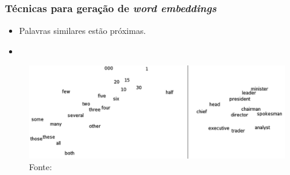 \documentclass[10pt]{beamer}
\begin{document}
\begin{frame}[fragile]
  \frametitle{Técnicas para geração de \textit{word embeddings}}

   \begin{itemize}
    \item[-] Palavras similares estão próximas.
    \item[\ ] \ 
  \end{itemize}

  \begin{figure}[htb]
  \begin{center}
      \includegraphics[scale=0.18]{img/Turian-WordTSNE}
  \end{center}
  \caption{Fonte: }

\end{figure}


\end{frame}
\end{document}
